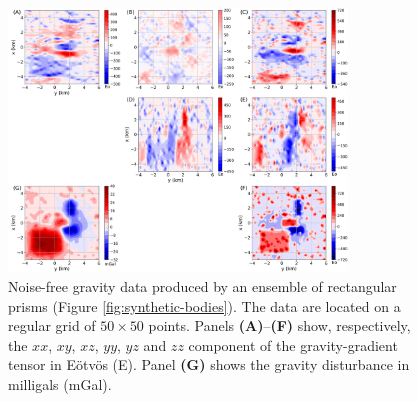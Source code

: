 \documentclass[utf8]{FrontiersinHarvard} %
\begin{document}
	\begin{figure}[htbp]
		\begin{center}
			\includegraphics[width=9cm]{Fig/noise-free-data}
		\end{center}
		\caption{
			Noise-free gravity data produced by an ensemble of rectangular prisms (Figure \ref{fig:synthetic-bodies}). 
			The data are located on a regular grid of $50 \times 50$ points. 
			Panels \textbf{(A)}--\textbf{(F)} show, respectively, the $xx$, $xy$, $xz$, $yy$, $yz$ and
			$zz$ component of the gravity-gradient tensor in Eötvös (E).
			Panel \textbf{(G)} shows the gravity disturbance in milligals (mGal).
		}
		\label{fig:noise-free-data}
	\end{figure}
	
\end{document}
